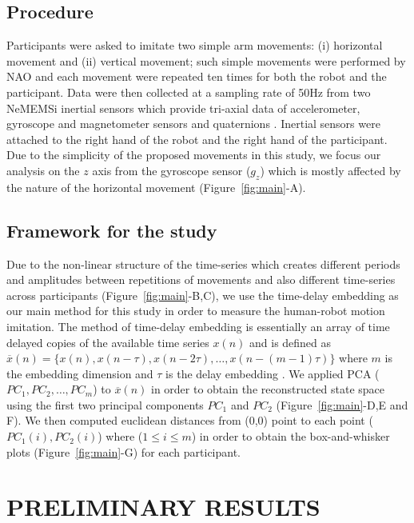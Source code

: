 \documentclass{sig-alternate-05-2015}
\begin{document}
\subsection{Procedure}
Participants were asked to imitate two simple arm movements: (i) 
horizontal movement and (ii) vertical movement;
such simple movements were performed by NAO and each movement were repeated ten times
for both the robot and the participant.
Data were then collected at a sampling rate of 50Hz from two NeMEMSi inertial sensors
which provide tri-axial data of accelerometer, gyroscope and magnetometer sensors and
quaternions \cite{Comotti2014}. Inertial sensors were attached to the right 
hand of the robot and the right hand of the participant.
Due to the simplicity of the proposed movements  in this study, 
we focus our analysis on the $z$ axis from the gyroscope sensor ($g_z$) 
which is mostly affected by the nature of the horizontal movement 
(Figure~\ref{fig:main}-A).

\subsection{Framework for the study}

Due to the non-linear structure of the time-series 
which creates different periods and amplitudes 
between repetitions of movements and also different time-series across participants
(Figure~\ref{fig:main}-B,C), we use the time-delay embedding
as our main method for this study in order to measure the human-robot motion imitation.
The method of time-delay embedding is essentially an array of 
time delayed copies of the available time series $x(n)$ and is defined as  
$ \overline{x}(n) = \{  x(n), x(n-\tau), x(n-2\tau), \dots,x(n-(m-1)\tau)\}$
where $m$ is the embedding dimension and $\tau$ is the delay embedding \cite{Huke2006}.
We applied PCA ($PC_1, PC_2, \dots, PC_m$) to $ \overline{x}(n)$
in order to obtain the reconstructed state space 
using the first two principal components $PC_1$ and $PC_2$ (Figure~\ref{fig:main}-D,E and F).
We then computed euclidean distances from (0,0) point to each 
point ($PC_1(i),PC_2(i)$) where ($1 \leq i \leq m$)
in order to obtain the box-and-whisker plots (Figure~\ref{fig:main}-G)
for each participant.




\section{PRELIMINARY RESULTS}
\end{document}
